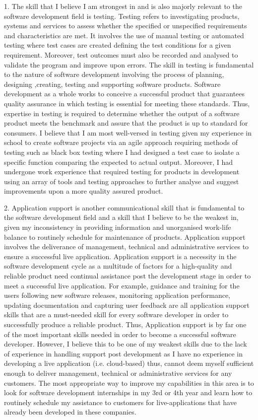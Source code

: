 \documentclass[a4paper, 11pt]{report}
\begin{document}
1. The skill that I believe I am strongest in and is also majorly relevant to the software development field is testing. Testing refers to investigating products, systems and services to assess whether the specified or unspecified requirements and characteristics are met. It involves the use of manual testing or automated testing where test cases are created defining the test conditions for a given requirement. Moreover, test outcomes must also be recorded and analysed to validate the program and improve upon errors. The skill in testing is fundamental to the nature of software development involving the process of planning, designing ,creating, testing and supporting software products. Software development as a whole works to conceive a successful product that guarantees quality assurance in which testing is essential for meeting these standards. Thus, expertise in testing is required to determine whether the output of a software product meets the benchmark and assure that the product is up to standard for consumers. I believe that I am most well-versed in testing given my experience in school to create software projects via an agile approach requiring methods of testing such as black box testing where I had designed a test case to isolate a specific function comparing the expected to actual output. Moreover, I had undergone work experience that required testing for products in development using an array of tools and testing approaches to further analyse and suggest improvements upon a more quality assured product. 

2. Application support is another communicational skill that is fundamental to the software development field and a skill that I believe to be the weakest in, given my inconsistency in providing information and unorganised work-life balance to routinely schedule for maintenance of products. Application support involves the deliverance of management, technical and administrative services to ensure a successful live application. Application support is a necessity in the software development cycle as a multitude of factors for a high-quality and reliable product need continual assistance post the development stage in order to meet a successful live application. For example, guidance and training for the users following new software releases, monitoring application performance, updating documentation and capturing user feedback are all application support skills that are a must-needed skill for every software developer in order to successfully produce a reliable product. Thus, Application support is by far one of the most important skills needed in order to become a successful software developer. However, I believe this to be one of my weakest skills due to the lack of experience in handling support post development as I have no experience in developing a live application (i.e. cloud-based) thus, cannot deem myself sufficient enough to deliver management, technical or administrative services for any customers. The most appropriate way to improve my capabilities in this area is to look for software development internships in my 3rd or 4th year and learn how to routinely schedule my assistance to customers for live-applications that have already been developed in these companies. 
\end{document}
